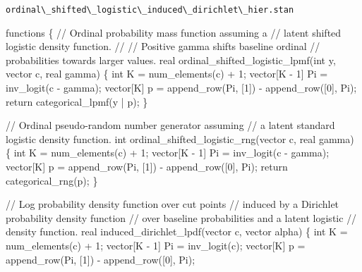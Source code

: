 \documentclass[
  letterpaper,
  DIV=11,
  numbers=noendperiod]{scrartcl}
\newenvironment{Shaded}{\begin{snugshade}}{\end{snugshade}}
\newcommand{\CommentTok}[1]{\textcolor[rgb]{0.37,0.37,0.37}{#1}}
\newcommand{\ControlFlowTok}[1]{\textcolor[rgb]{0.00,0.23,0.31}{#1}}
\newcommand{\DataTypeTok}[1]{\textcolor[rgb]{0.68,0.00,0.00}{#1}}
\newcommand{\DecValTok}[1]{\textcolor[rgb]{0.68,0.00,0.00}{#1}}
\newcommand{\KeywordTok}[1]{\textcolor[rgb]{0.00,0.23,0.31}{#1}}
\newcommand{\NormalTok}[1]{\textcolor[rgb]{0.00,0.23,0.31}{#1}}
\begin{document}
\begin{codelisting}

\caption{\texttt{ordinal\textbackslash\_shifted\textbackslash\_logistic\textbackslash\_induced\textbackslash\_dirichlet\textbackslash\_hier.stan}}

\begin{Shaded}
\begin{Highlighting}[]
\KeywordTok{functions}\NormalTok{ \{}
  \CommentTok{// Ordinal probability mass function assuming a}
  \CommentTok{// latent shifted logistic density function.}
  \CommentTok{//}
  \CommentTok{// Positive gamma shifts baseline ordinal}
  \CommentTok{// probabilities towards larger values.}
  \DataTypeTok{real}\NormalTok{ ordinal\_shifted\_logistic\_lpmf(}\DataTypeTok{int}\NormalTok{ y, }\DataTypeTok{vector}\NormalTok{ c, }\DataTypeTok{real}\NormalTok{ gamma) \{}
    \DataTypeTok{int}\NormalTok{ K = num\_elements(c) + }\DecValTok{1}\NormalTok{;}
    \DataTypeTok{vector}\NormalTok{[K {-} }\DecValTok{1}\NormalTok{] Pi = inv\_logit(c {-} gamma);}
    \DataTypeTok{vector}\NormalTok{[K] p = append\_row(Pi, [}\DecValTok{1}\NormalTok{]\textquotesingle{}) {-} append\_row([}\DecValTok{0}\NormalTok{]\textquotesingle{}, Pi);}
    \ControlFlowTok{return}\NormalTok{ categorical\_lpmf(y | p);}
\NormalTok{  \}}

  \CommentTok{// Ordinal pseudo{-}random number generator assuming}
  \CommentTok{// a latent standard logistic density function.}
  \DataTypeTok{int}\NormalTok{ ordinal\_shifted\_logistic\_rng(}\DataTypeTok{vector}\NormalTok{ c, }\DataTypeTok{real}\NormalTok{ gamma) \{}
    \DataTypeTok{int}\NormalTok{ K = num\_elements(c) + }\DecValTok{1}\NormalTok{;}
    \DataTypeTok{vector}\NormalTok{[K {-} }\DecValTok{1}\NormalTok{] Pi = inv\_logit(c {-} gamma);}
    \DataTypeTok{vector}\NormalTok{[K] p = append\_row(Pi, [}\DecValTok{1}\NormalTok{]\textquotesingle{}) {-} append\_row([}\DecValTok{0}\NormalTok{]\textquotesingle{}, Pi);}
    \ControlFlowTok{return}\NormalTok{ categorical\_rng(p);}
\NormalTok{  \}}

  \CommentTok{// Log probability density function over cut points}
  \CommentTok{// induced by a Dirichlet probability density function}
  \CommentTok{// over baseline probabilities and a latent logistic}
  \CommentTok{// density function.}
  \DataTypeTok{real}\NormalTok{ induced\_dirichlet\_lpdf(}\DataTypeTok{vector}\NormalTok{ c, }\DataTypeTok{vector}\NormalTok{ alpha) \{}
    \DataTypeTok{int}\NormalTok{ K = num\_elements(c) + }\DecValTok{1}\NormalTok{;}
    \DataTypeTok{vector}\NormalTok{[K {-} }\DecValTok{1}\NormalTok{] Pi = inv\_logit(c);}
    \DataTypeTok{vector}\NormalTok{[K] p = append\_row(Pi, [}\DecValTok{1}\NormalTok{]\textquotesingle{}) {-} append\_row([}\DecValTok{0}\NormalTok{]\textquotesingle{}, Pi);}


\end{Highlighting}
\end{Shaded}
\end{codelisting}
\end{document}
